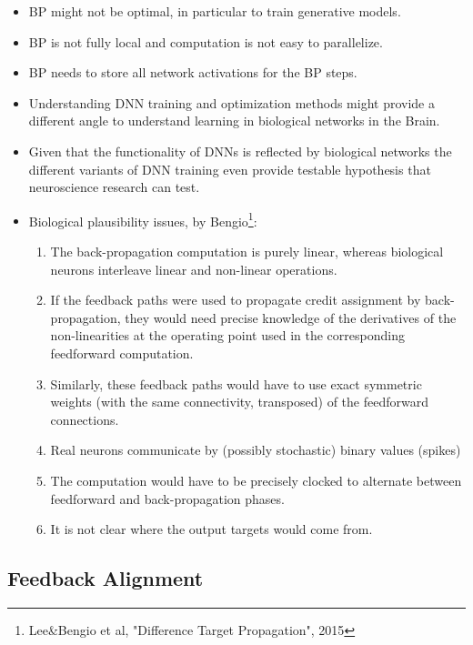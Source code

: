 \documentclass[main]{subfiles}
\begin{document}
\begin{itemize}
    \item BP might not be optimal, in particular to train generative models.
    \item BP is not fully local and computation is not easy to parallelize.
    \item BP needs to store all network activations for the BP steps.
    \item Understanding DNN training and optimization methods might provide a different angle to understand learning in biological networks in the Brain. 
    \item Given that the functionality of DNNs is reflected by biological networks the different variants of DNN training even provide testable hypothesis that neuroscience research can test.
    \item Biological plausibility issues, by Bengio\footnote{Lee\&Bengio et al, "Difference Target Propagation", 2015}:
    \begin{enumerate}
        \item The back-propagation computation is purely linear, whereas biological neurons interleave linear and non-linear operations.
        \item If the feedback paths were used to propagate credit assignment by back-propagation, they would need precise knowledge of the derivatives of the non-linearities at the operating point used in the corresponding feedforward computation.
        \item Similarly, these feedback paths would have to use exact symmetric weights (with the same connectivity, transposed) of the feedforward connections.
        \item Real neurons communicate by (possibly stochastic) binary values (spikes)
        \item The computation would have to be precisely clocked to alternate between feedforward and back-propagation phases.
        \item It is not clear where the output targets would come from.
    \end{enumerate}

\end{itemize}




\subsection{Feedback Alignment}
\end{document}
